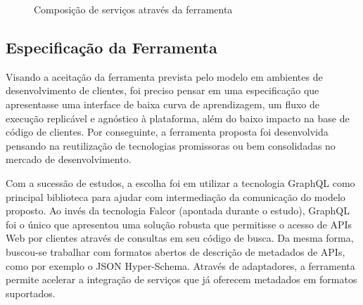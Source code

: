 \documentclass[12pt]{article}
\begin{document}
\begin{figure}[H]
  \centering
  \caption{Composição de serviços através da ferramenta}
\end{figure}

  \subsection{Especificação da Ferramenta}

  Visando a aceitação da ferramenta prevista pelo modelo em ambientes de desenvolvimento de clientes, foi preciso pensar em uma especificação que apresentasse uma interface de baixa curva de aprendizagem, um fluxo de execução replicável e agnóstico à plataforma, além do baixo impacto na base de código de clientes. Por conseguinte, a ferramenta proposta foi desenvolvida pensando na reutilização de tecnologias promissoras ou bem consolidadas no mercado de desenvolvimento.

  Com a sucessão de estudos, a escolha foi em utilizar a tecnologia GraphQL como principal biblioteca para ajudar com intermediação da comunicação do modelo proposto. Ao invés da tecnologia Falcor (apontada durante o estudo), GraphQL foi o único que apresentou uma solução robusta que permitisse o acesso de APIs Web por clientes através de consultas em seu código de busca. Da mesma forma, buscou-se trabalhar com formatos abertos de descrição de metadados de APIs, como por exemplo o JSON Hyper-Schema. Através de adaptadores, a ferramenta permite acelerar a integração de serviços que já oferecem metadados em formatos suportados.
\end{document}
